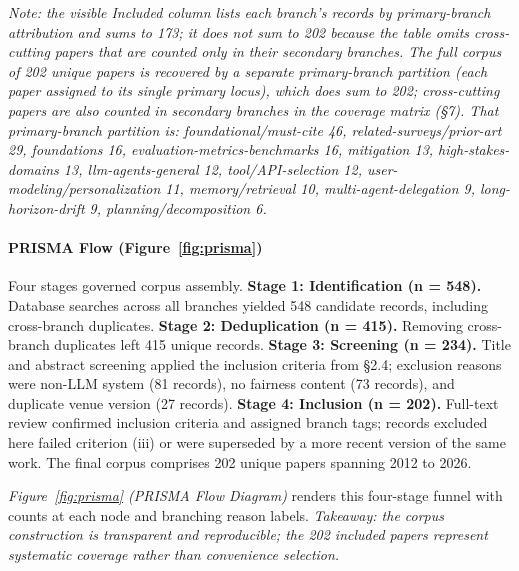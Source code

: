 \documentclass[acmsmall,nonacm]{acmart}
\begin{document}
\emph{Note: the visible Included column lists each branch's records by primary-branch attribution and sums to 173; it does not sum to 202 because the table omits cross-cutting papers that are counted only in their secondary branches. The full corpus of 202 unique papers is recovered by a separate primary-branch partition (each paper assigned to its single primary locus), which does sum to 202; cross-cutting papers are also counted in secondary branches in the coverage matrix (\S{}7). That primary-branch partition is: foundational/must-cite 46, related-surveys/prior-art 29, foundations 16, evaluation-metrics-benchmarks 16, mitigation 13, high-stakes-domains 13, llm-agents-general 12, tool/API-selection 12, user-modeling/personalization 11, memory/retrieval 10, multi-agent-delegation 9, long-horizon-drift 9, planning/decomposition 6.}

\paragraph{PRISMA Flow (Figure~\ref{fig:prisma})}

Four stages governed corpus assembly. \textbf{Stage 1: Identification (n = 548).} Database searches across all branches yielded 548 candidate records, including cross-branch duplicates. \textbf{Stage 2: Deduplication (n = 415).} Removing cross-branch duplicates left 415 unique records. \textbf{Stage 3: Screening (n = 234).} Title and abstract screening applied the inclusion criteria from \S{}2.4; exclusion reasons were non-LLM system (81 records), no fairness content (73 records), and duplicate venue version (27 records). \textbf{Stage 4: Inclusion (n = 202).} Full-text review confirmed inclusion criteria and assigned branch tags; records excluded here failed criterion (iii) or were superseded by a more recent version of the same work. The final corpus comprises 202 unique papers spanning 2012 to 2026.

\emph{Figure~\ref{fig:prisma} (PRISMA Flow Diagram)} renders this four-stage funnel with counts at each node and branching reason labels. \emph{Takeaway: the corpus construction is transparent and reproducible; the 202 included papers represent systematic coverage rather than convenience selection.}
\end{document}
